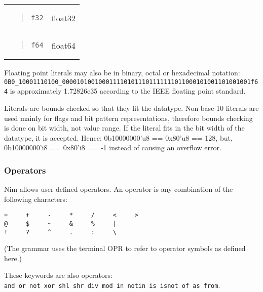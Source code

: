 \begin{longtable}[]{@{}ll@{}}
\begin{minipage}[t]{0.47\columnwidth}\raggedright
\begin{quote}
\texttt{\textquotesingle{}f32}
\end{quote}\strut
\end{minipage} & \begin{minipage}[t]{0.47\columnwidth}\raggedright
float32\strut
\end{minipage}\tabularnewline
\begin{minipage}[t]{0.47\columnwidth}\raggedright
\begin{quote}
\texttt{\textquotesingle{}f64}
\end{quote}\strut
\end{minipage} & \begin{minipage}[t]{0.47\columnwidth}\raggedright
float64\strut
\end{minipage}\tabularnewline
\bottomrule
\end{longtable}

Floating point literals may also be in binary, octal or hexadecimal
notation:
\texttt{0B0\_10001110100\_0000101001000111101011101111111011000101001101001001\textquotesingle{}f64}
is approximately 1.72826e35 according to the IEEE floating point
standard.

Literals are bounds checked so that they fit the datatype. Non base-10
literals are used mainly for flags and bit pattern representations,
therefore bounds checking is done on bit width, not value range. If the
literal fits in the bit width of the datatype, it is accepted. Hence:
0b10000000'u8 == 0x80'u8 == 128, but, 0b10000000'i8 == 0x80'i8 == -1
instead of causing an overflow error.

\hypertarget{operators}{%
\subsubsection{Operators}\label{operators}}

Nim allows user defined operators. An operator is any combination of the
following characters:

\begin{verbatim}
=     +     -     *     /     <     >
@     $     ~     &     %     |
!     ?     ^     .     :     \
\end{verbatim}

(The grammar uses the terminal OPR to refer to operator symbols as
defined here.)

These keywords are also operators:
\texttt{and\ or\ not\ xor\ shl\ shr\ div\ mod\ in\ notin\ is\ isnot\ of\ as\ from}.

